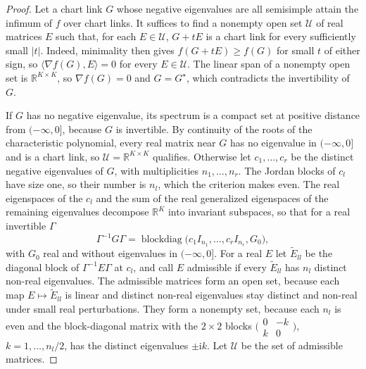 \documentclass[11pt]{article}
\theoremstyle{definition}
\theoremstyle{remark}
\newcommand{\R}{\mathbb R}
\begin{document}
\begin{proof}
Let a chart link $G$ whose negative eigenvalues are all semisimple attain the infimum of $f$ over chart links. It suffices to find a nonempty open set $\mathcal U$ of real matrices $E$ such that, for each $E\in\mathcal U$, $G+tE$ is a chart link for every sufficiently small $|t|$. Indeed, minimality then gives $f(G+tE)\ge f(G)$ for small $t$ of either sign, so $\langle\nabla f(G),E\rangle=0$ for every $E\in\mathcal U$. The linear span of a nonempty open set is $\R^{K\times K}$, so $\nabla f(G)=0$ and $G=G^\star$, which contradicts the invertibility of $G$.

If $G$ has no negative eigenvalue, its spectrum is a compact set at positive distance from $(-\infty,0]$, because $G$ is invertible. By continuity of the roots of the characteristic polynomial, every real matrix near $G$ has no eigenvalue in $(-\infty,0]$ and is a chart link, so $\mathcal U=\R^{K\times K}$ qualifies. Otherwise let $c_1,\dots,c_r$ be the distinct negative eigenvalues of $G$, with multiplicities $n_1,\dots,n_r$. The Jordan blocks of $c_l$ have size one, so their number is $n_l$, which the criterion makes even. The real eigenspaces of the $c_l$ and the sum of the real generalized eigenspaces of the remaining eigenvalues decompose $\R^K$ into invariant subspaces, so that for a real invertible $\Gamma$
\begin{equation*}
\Gamma^{-1}G\Gamma=\operatorname{blockdiag}\big(c_1I_{n_1},\dots,c_rI_{n_r},G_0\big),
\end{equation*}
with $G_0$ real and without eigenvalues in $(-\infty,0]$. For a real $E$ let $\tilde E_{ll}$ be the diagonal block of $\Gamma^{-1}E\Gamma$ at $c_l$, and call $E$ admissible if every $\tilde E_{ll}$ has $n_l$ distinct non-real eigenvalues. The admissible matrices form an open set, because each map $E\mapsto\tilde E_{ll}$ is linear and distinct non-real eigenvalues stay distinct and non-real under small real perturbations. They form a nonempty set, because each $n_l$ is even and the block-diagonal matrix with the $2\times2$ blocks $\big(\begin{smallmatrix}0&-k\\k&0\end{smallmatrix}\big)$, $k=1,\dots,n_l/2$, has the distinct eigenvalues $\pm\mathrm ik$. Let $\mathcal U$ be the set of admissible matrices.


\end{proof}
\end{document}
